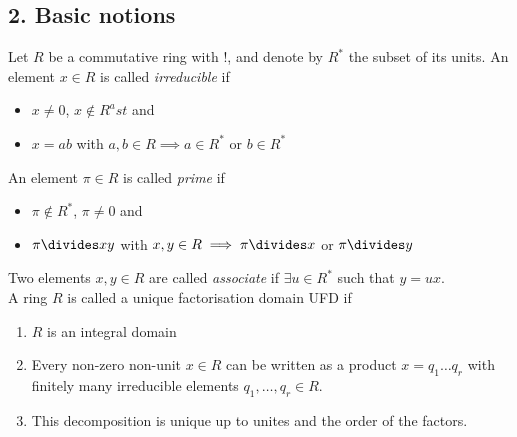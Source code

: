 \documentclass[NumTh.tex]{subfiles}
\begin{document}
\subsection{2. Basic notions}

Let $R$ be a commutative ring with $!$,
and denote by $R^\ast$ the subset of its units.
An element $x \in R$ is called \emph{irreducible} if
\begin{itemize}
  \item $x \neq 0$, $x \nin R^ast$ and
  \item $x = ab$ with $a,b \in R \implies a \in R^\ast$ or $b \in R^\ast$
\end{itemize}
An element $\pi \in R$ is called \emph{prime} if
\begin{itemize}
  \item $\pi \nin R^\ast$, $\pi \neq 0$ and
  \item $\pi \divides xy$ with $x,y \in R \implies \pi \divides x$ or $\pi \divides y$
\end{itemize}
Two elements $x,y \in R$ are called \emph{associate} if $\exists u \in R^\ast$ such that $y = ux$.
\\

A ring $R$ is called a unique factorisation domain UFD if
\begin{enumerate}
  \item $R$ is an integral domain
  \item Every non-zero non-unit $x \in R$ can be written as a product $x = q_1 \dots q_r$ with finitely many irreducible elements $q_1,\dots,q_r \in R$.
  \item This decomposition is unique up to unites and the order of the factors.
\end{enumerate}
\end{document}
